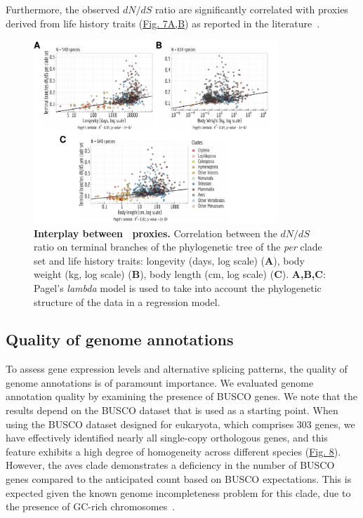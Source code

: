 Furthermore, the observed ${dN}/{dS}$ ratio are significantly correlated with proxies derived from life history traits (\hyperref[fig:gtdrift7]{Fig. 7A,B}) as reported in the literature~\citep{romiguier_comparative_2014, figuet_life_2016}.

\begin{figure}[t]   
         \centering
        \includegraphics[width=0.82\textwidth]{Figure7.pdf}
                                                                           
    \caption[Interplay between \Ne~proxies]{\textbf{Interplay between \Ne~proxies.} Correlation between the ${dN}/{dS}$ ratio on terminal branches of the phylogenetic tree of the \textit{per} clade set and life history traits:  longevity (days, log scale) (\textbf{A}), body weight (kg, log scale) (\textbf{B}), body length (cm, log scale) (\textbf{C}). \textbf{A,B,C}: Pagel's \textit{lambda} model is used to take into account the phylogenetic structure of the data in a regression model.\newline}
    \label{fig:gtdrift7}
\end{figure}

\subsection{Quality of genome annotations}
To assess gene expression levels and alternative splicing patterns, the quality of genome annotations is of paramount importance. We evaluated genome annotation quality by examining the presence of \acrshort{BUSCO} genes. We note that the results depend on the \acrshort{BUSCO} dataset that is used as a starting point. When using the \acrshort{BUSCO} dataset designed for eukaryota, which comprises 303 genes, we have effectively identified nearly all single-copy orthologous genes, and this feature exhibits a high degree of homogeneity across different species (\hyperref[fig:gtdrift8]{Fig. 8}). However, the aves clade demonstrates a deficiency in the number of \acrshort{BUSCO} genes compared to the anticipated count based on \acrshort{BUSCO} expectations. This is expected given the known genome incompleteness problem for this clade, due to the presence of GC-rich chromosomes~\citep{li_novo_2022}. 

